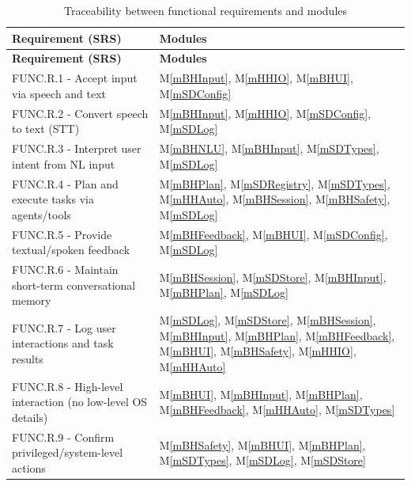 \documentclass[12pt, titlepage]{article}
\newcommand{\mref}[1]{M\ref{#1}}
\begin{document}
\renewcommand{\arraystretch}{1.1}
\begin{longtable}{p{} p{}}
\caption{Traceability between functional requirements and modules}
\label{TblRT}\\
\toprule
\textbf{Requirement (SRS)} & \textbf{Modules}\\
\midrule
\endfirsthead
\toprule
\textbf{Requirement (SRS)} & \textbf{Modules}\\
\midrule
\endhead
FUNC.R.1 - Accept input via speech and text
  & \mref{mBHInput}, \mref{mHHIO}, \mref{mBHUI}, \mref{mSDConfig} \\
FUNC.R.2 - Convert speech to text (STT)
  & \mref{mBHInput}, \mref{mHHIO}, \mref{mSDConfig}, \mref{mSDLog} \\
FUNC.R.3 - Interpret user intent from NL input
  & \mref{mBHNLU}, \mref{mBHInput}, \mref{mSDTypes}, \mref{mSDLog} \\
FUNC.R.4 - Plan and execute tasks via agents/tools
  & \mref{mBHPlan}, \mref{mSDRegistry}, \mref{mSDTypes},
    \mref{mHHAuto}, \mref{mBHSession}, \mref{mBHSafety}, \mref{mSDLog} \\
FUNC.R.5 - Provide textual/spoken feedback
  & \mref{mBHFeedback}, \mref{mBHUI}, \mref{mSDConfig}, \mref{mSDLog} \\
FUNC.R.6 - Maintain short-term conversational memory
  & \mref{mBHSession}, \mref{mSDStore}, \mref{mBHInput},
    \mref{mBHPlan}, \mref{mSDLog} \\
FUNC.R.7 - Log user interactions and task results
  & \mref{mSDLog}, \mref{mSDStore}, \mref{mBHSession},
    \mref{mBHInput}, \mref{mBHPlan}, \mref{mBHFeedback},
    \mref{mBHUI}, \mref{mBHSafety}, \mref{mHHIO}, \mref{mHHAuto} \\
FUNC.R.8 - High-level interaction (no low-level OS details)
  & \mref{mBHUI}, \mref{mBHInput}, \mref{mBHPlan},
    \mref{mBHFeedback}, \mref{mHHAuto}, \mref{mSDTypes} \\
FUNC.R.9 - Confirm privileged/system-level actions
  & \mref{mBHSafety}, \mref{mBHUI}, \mref{mBHPlan},
    \mref{mSDTypes}, \mref{mSDLog}, \mref{mSDStore} \\
\bottomrule
\end{longtable}
\end{document}
